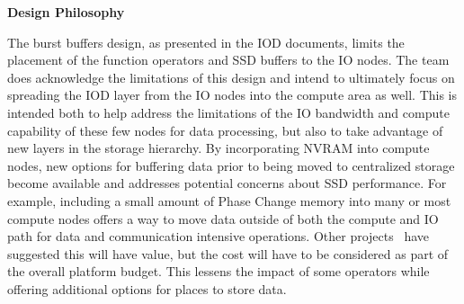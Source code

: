 \documentclass[conference]{IEEEtran}
\begin{document}
%

\noindent\textbf{Design Philosophy}

The burst buffers design, as presented in the IOD documents, limits the
placement of the function operators and SSD buffers to the IO nodes. The team
does acknowledge the limitations of this design and intend to ultimately focus
on spreading the IOD layer from the IO nodes into the compute area as well.
This is intended both to help address the limitations of the IO bandwidth and
compute capability of these few nodes for data processing, but also to take
advantage of new layers in the storage hierarchy. By incorporating NVRAM into
compute nodes, new options for buffering data prior to being moved to
centralized storage become available and addresses potential concerns about
SSD performance. For example, including a small amount of Phase Change memory
into many or most compute nodes offers a way to move data outside of both the
compute and IO path for data and communication intensive operations. Other 
projects~\cite{zheng:2010:predata} have suggested this will have value, but the
cost will have to be considered as part of the overall platform budget. This
lessens the impact of some operators while offering additional options for
places to store data.
\end{document}
